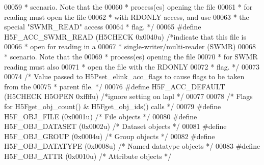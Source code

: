 \begin{DoxyCode}
00059 \textcolor{comment}{                                                 * scenario.  Note that the}
00060 \textcolor{comment}{                                                 * process(es) opening the file}
00061 \textcolor{comment}{                                                 * for reading must open the file}
00062 \textcolor{comment}{                                                 * with RDONLY access, and use}
00063 \textcolor{comment}{                                                 * the special "SWMR\_READ" access}
00064 \textcolor{comment}{                                                 * flag. */}\textcolor{preprocessor}{}
00065 \textcolor{preprocessor}{#define H5F\_ACC\_SWMR\_READ   (H5CHECK 0x0040u) }\textcolor{comment}{/*indicate that this file is}
00066 \textcolor{comment}{                                                 * open for reading in a}
00067 \textcolor{comment}{                                                 * single-writer/multi-reader (SWMR)}
00068 \textcolor{comment}{                                                 * scenario.  Note that the}
00069 \textcolor{comment}{                                                 * process(es) opening the file}
00070 \textcolor{comment}{                                                 * for SWMR reading must also}
00071 \textcolor{comment}{                                                 * open the file with the RDONLY}
00072 \textcolor{comment}{                                                 * flag.  */}\textcolor{preprocessor}{}
00073 
00074 \textcolor{comment}{/* Value passed to H5Pset\_elink\_acc\_flags to cause flags to be taken from the}
00075 \textcolor{comment}{ * parent file. */}
00076 \textcolor{preprocessor}{#define H5F\_ACC\_DEFAULT (H5CHECK H5OPEN 0xffffu)    }\textcolor{comment}{/*ignore setting on lapl     */}\textcolor{preprocessor}{}
00077 
00078 \textcolor{comment}{/* Flags for H5Fget\_obj\_count() & H5Fget\_obj\_ids() calls */}
00079 \textcolor{preprocessor}{#define H5F\_OBJ\_FILE    (0x0001u)       }\textcolor{comment}{/* File objects */}\textcolor{preprocessor}{}
00080 \textcolor{preprocessor}{#define H5F\_OBJ\_DATASET (0x0002u)       }\textcolor{comment}{/* Dataset objects */}\textcolor{preprocessor}{}
00081 \textcolor{preprocessor}{#define H5F\_OBJ\_GROUP   (0x0004u)       }\textcolor{comment}{/* Group objects */}\textcolor{preprocessor}{}
00082 \textcolor{preprocessor}{#define H5F\_OBJ\_DATATYPE (0x0008u)      }\textcolor{comment}{/* Named datatype objects */}\textcolor{preprocessor}{}
00083 \textcolor{preprocessor}{#define H5F\_OBJ\_ATTR    (0x0010u)       }\textcolor{comment}{/* Attribute objects */}\textcolor{preprocessor}{}

\end{DoxyCode}
